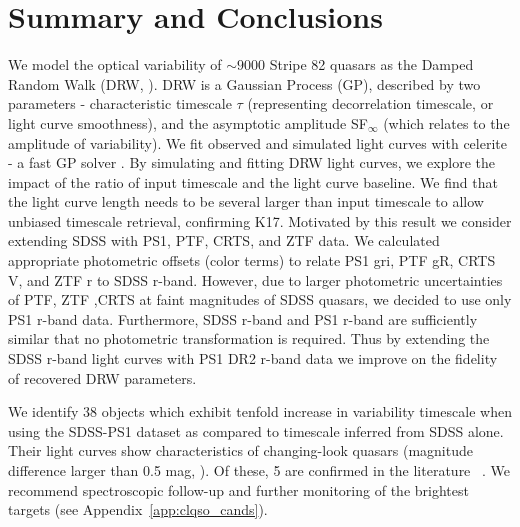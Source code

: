 \documentclass[twocolumn]{aastex62}
\newcommand{\project}[1]{\textsf{#1}}
\begin{document}
%
%
%
%

\section{Summary and Conclusions}
\label{sec:conclusions}
We model the optical variability of ${\sim} 9000$ Stripe 82 quasars as the Damped Random Walk (DRW, \citealt{kelly2009}). DRW is a Gaussian Process (GP), described by two parameters - characteristic timescale $\tau$ (representing decorrelation timescale, or light curve smoothness), and the asymptotic amplitude SF$_{\infty}$ (which relates to the amplitude of variability). We fit observed and simulated light curves with \project{celerite} - a fast GP solver \citep{foreman2017}. By simulating and fitting DRW light curves, we explore the impact of the ratio of input timescale and the light curve baseline. We find that the light curve length needs to be several larger than input timescale to allow unbiased timescale retrieval, confirming K17. Motivated by this result we consider extending SDSS with PS1, PTF, CRTS, and ZTF data.  We calculated appropriate photometric offsets (color terms) to relate PS1 gri, PTF gR,  CRTS V, and ZTF r to SDSS r-band. However, due to larger photometric uncertainties of PTF, ZTF ,CRTS at faint magnitudes of SDSS quasars, we decided to use only PS1 r-band data. Furthermore, SDSS r-band and PS1 r-band are sufficiently similar that no photometric transformation is required.  Thus by extending the SDSS r-band light curves with PS1 DR2 r-band data we improve on the fidelity of recovered DRW parameters. 

We identify 38 objects which exhibit tenfold increase in variability timescale when using the SDSS-PS1 dataset as compared to timescale inferred from SDSS alone. Their light curves show characteristics of changing-look quasars (magnitude difference larger than 0.5 mag, \citealt{macleod2016}). Of these, 5 are confirmed in the literature ~\citep{macleod2019, lamassa2015}. We recommend spectroscopic follow-up and further monitoring of the brightest targets (see Appendix~\ref{app:clqso_cands}).
\end{document}
